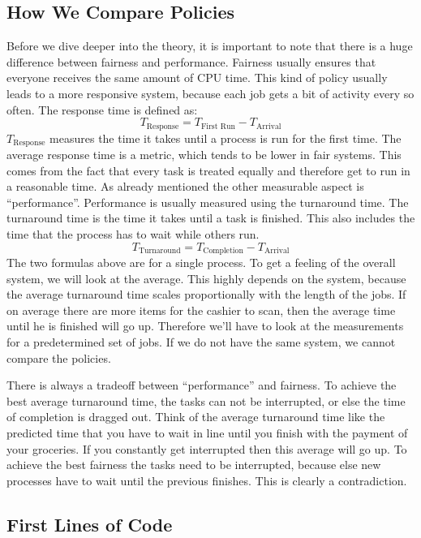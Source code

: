 \subsection{How We Compare Policies}

Before we dive deeper into the theory, it is important to note that there is a huge difference between fairness and performance.
Fairness usually ensures that everyone receives the same amount of CPU time.
This kind of policy usually leads to a more responsive system, because each job gets a bit of activity every so often.
The response time is defined as:
$$T_{\text{Response}} = T_{\text{First Run}} - T_{\text{Arrival}}$$
$T_{\text{Response}}$ measures the time it takes until a process is run for the first time.
The average response time is a metric, which tends to be lower in fair systems.
This comes from the fact that every task is treated equally and therefore get to run in a reasonable time.
As already mentioned the other measurable aspect is ``performance''.
Performance is usually measured using the turnaround time.
The turnaround time is the time it takes until a task is finished. This also includes the time that the process has to wait while others run.
$$T_{\text{Turnaround}} = T_{\text{Completion}} - T_{\text{Arrival}}$$
The two formulas above are for a single process. To get a feeling of the overall system, we will look at the average. This highly depends on the system, because the average turnaround time scales proportionally with the length of the jobs.
If on average there are more items for the cashier to scan, then the average time until he is finished will go up.
Therefore we’ll have to look at the measurements for a predetermined set of jobs.
If we do not have the same system, we cannot compare the policies.

There is always a tradeoff between ``performance'' and fairness.
To achieve the best average turnaround time, the tasks can not be interrupted, or else the time of completion is dragged out.
Think of the average turnaround time like the predicted time that you have to wait in line until you finish with the payment of your groceries. If you constantly get interrupted then this average will go up.
To achieve the best fairness the tasks need to be interrupted, because else new processes have to wait until the previous finishes.
This is clearly a contradiction.


\subsection{First Lines of Code} \label{sec:first-lines-of-code}


